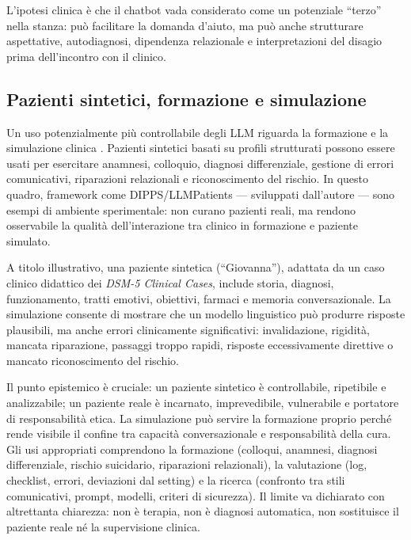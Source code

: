 \documentclass[11pt,a4paper]{article}
\begin{document}
L'ipotesi clinica è che il chatbot vada considerato come un potenziale ``terzo'' nella stanza: può facilitare la domanda d'aiuto, ma può anche strutturare aspettative, autodiagnosi, dipendenza relazionale e interpretazioni del disagio prima dell'incontro con il clinico.

\subsection{Pazienti sintetici, formazione e simulazione}
\label{sec:sintetici}

Un uso potenzialmente più controllabile degli LLM riguarda la formazione e la simulazione clinica \cite{holderried2024}. Pazienti sintetici basati su profili strutturati possono essere usati per esercitare anamnesi, colloquio, diagnosi differenziale, gestione di errori comunicativi, riparazioni relazionali e riconoscimento del rischio. In questo quadro, framework come DIPPS/LLMPatients --- sviluppati dall'autore --- sono esempi di ambiente sperimentale: non curano pazienti reali, ma rendono osservabile la qualità dell'interazione tra clinico in formazione e paziente simulato.

A titolo illustrativo, una paziente sintetica (``Giovanna''), adattata da un caso clinico didattico dei \emph{DSM-5 Clinical Cases}, include storia, diagnosi, funzionamento, tratti emotivi, obiettivi, farmaci e memoria conversazionale. La simulazione consente di mostrare che un modello linguistico può produrre risposte plausibili, ma anche errori clinicamente significativi: invalidazione, rigidità, mancata riparazione, passaggi troppo rapidi, risposte eccessivamente direttive o mancato riconoscimento del rischio.

Il punto epistemico è cruciale: un paziente sintetico è controllabile, ripetibile e analizzabile; un paziente reale è incarnato, imprevedibile, vulnerabile e portatore di responsabilità etica. La simulazione può servire la formazione proprio perché rende visibile il confine tra capacità conversazionale e responsabilità della cura. Gli usi appropriati comprendono la formazione (colloqui, anamnesi, diagnosi differenziale, rischio suicidario, riparazioni relazionali), la valutazione (log, checklist, errori, deviazioni dal setting) e la ricerca (confronto tra stili comunicativi, prompt, modelli, criteri di sicurezza). Il limite va dichiarato con altrettanta chiarezza: non è terapia, non è diagnosi automatica, non sostituisce il paziente reale né la supervisione clinica.

\end{document}
